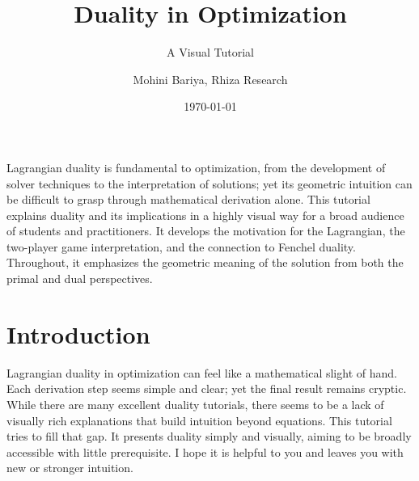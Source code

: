\documentclass[11pt,a4paper,twoside]{scrartcl} %
\title{Duality in Optimization}
\subtitle{A Visual Tutorial}
\author{Mohini Bariya, Rhiza Research}
\date{\today}
\begin{document}
\maketitle

\begin{center}
{\bfseries\abstractname}
\end{center}
\begin{center}
\begin{minipage}{0.9\textwidth}
\small
Lagrangian duality is fundamental to optimization, from the development of solver techniques to the interpretation of solutions; yet its geometric intuition can be difficult to grasp through mathematical derivation alone. This tutorial explains duality and its implications in a highly visual way for a broad audience of students and practitioners. It develops the motivation for the Lagrangian, the two-player game interpretation, and the connection to Fenchel duality. Throughout, it emphasizes the geometric meaning of the solution from both the primal and dual perspectives.
\end{minipage}
\end{center}

\section{Introduction}
Lagrangian duality in optimization can feel like a mathematical slight of hand.  Each derivation step seems simple and clear; yet the final result remains cryptic. While there are many excellent duality tutorials, there seems to be a lack of visually rich explanations that build intuition beyond equations. This tutorial tries to fill that gap. It presents duality simply and visually, aiming to be broadly accessible with little prerequisite. I hope it is helpful to you and leaves you with new or stronger intuition.
\end{document}
